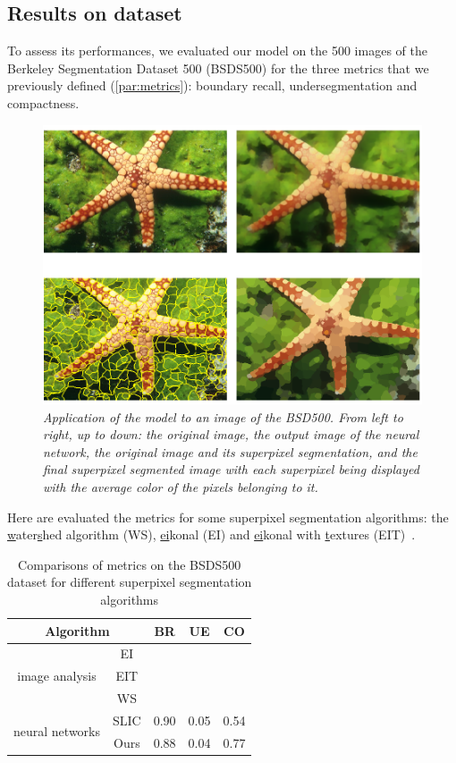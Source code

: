 \documentclass{article}
\begin{document}
    \subsection{Results on dataset}
        To assess its performances, we evaluated our model on the 500 images of the Berkeley Segmentation Dataset 500 (BSDS500)\cite{arbelaez2011} for the three metrics that we previously defined (\ref{par:metrics}): boundary recall, undersegmentation and compactness.
        \begin{figure}[!htb]
            \centering
            \includegraphics[width=.8\linewidth]{pics/img_bsd_res2.png}
            \caption{\textit{Application of the model to an image of the BSD500. From left to right, up to down: the original image, the output image of the neural network, the original image and its superpixel segmentation\cite{groundtruthornot}, and the final superpixel segmented image with each superpixel being displayed with the average color of the pixels belonging to it.}}
        \end{figure}
        \cite{checkplacement}
        Here are evaluated the metrics for some superpixel segmentation algorithms: the \underline{w}ater\underline{s}hed algorithm (WS), \underline{ei}konal (EI) and \underline{ei}konal with \underline{t}extures (EIT)~\cite{figliuzzi2019}.
        \cite{todo:metrics}
        \begin{table}[!ht]
            \centering
            \begin{tabular}{|c|c|ccc|}
                \hline
                \multicolumn{2}{|c|}{Algorithm} & BR & UE & CO\\
                \hline
                \hline
                \multirow{3}{*}{image analysis} & EI & & & \\
                                                & EIT & & & \\
                                                & WS & & & \\
                \hline
                \multirow{2}{*}{neural networks} & SLIC & 0.90 & 0.05 & 0.54\\
                                                 & Ours & 0.88 & 0.04 & 0.77\\
                \hline
            \end{tabular}
            \caption{Comparisons of metrics on the BSDS500 dataset for different superpixel segmentation algorithms}
        \end{table}
\end{document}
